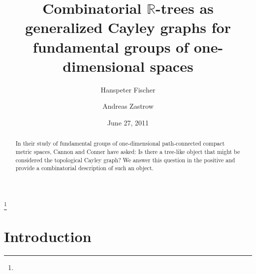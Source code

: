 \documentclass{amsart}
\theoremstyle{definition}
\theoremstyle{remark}
\numberwithin{equation}{section}
\begin{document}
\title[Combinatorial $\mathbb{R}$-trees as generalized Cayley graphs]{Combinatorial $\mathbb{R}$-trees as\\ generalized Cayley graphs for \\fundamental groups of one-dimensional spaces}

\author{Hanspeter Fischer}

\address{Department of Mathematical Sciences\\Ball State University\\Muncie, IN 47306\\U.S.A.}


\author{Andreas Zastrow}

\address{Institute of Mathematics, University of Gda\'nsk, ul. Wita Stwosza 57,
80-952 Gda\'nsk, Poland}


\thanks{}



\date{June 27, 2011}

\commby{}

\begin{abstract}
In their study of fundamental groups of one-dimensional path-connected compact metric
spaces, Cannon and
Conner have asked: Is there a tree-like object that might be
considered the topological Cayley graph? We answer  this question in the positive and provide a  combinatorial description of
such an object.
\end{abstract}

\mbox{\hspace{1pt}}\vspace{-.7in}

 \maketitle

\vspace{-30pt}

\tableofcontents

\vspace{-35pt}

\section{Introduction}
\end{document}
